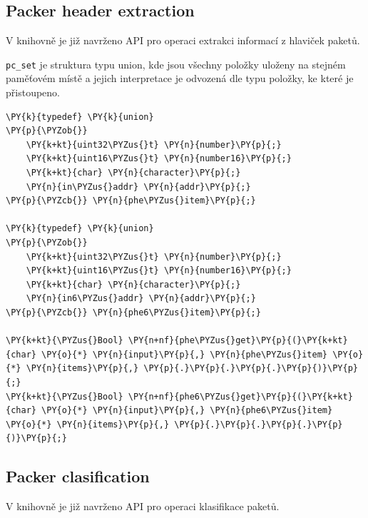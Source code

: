 \subsection{Packer header extraction}
V knihovně je již navrženo API pro operaci extrakci informací z hlaviček paketů.

\texttt{pc\_set} je struktura typu union, kde jsou všechny položky uloženy na stejném paměťovém místě
a jejich interpretace je odvozená dle typu položky, ke které je přistoupeno.

\begin{Verbatim}[commandchars=\\\{\}]
\PY{k}{typedef} \PY{k}{union}
\PY{p}{\PYZob{}}
	\PY{k+kt}{uint32\PYZus{}t} \PY{n}{number}\PY{p}{;}
	\PY{k+kt}{uint16\PYZus{}t} \PY{n}{number16}\PY{p}{;}
	\PY{k+kt}{char} \PY{n}{character}\PY{p}{;}
	\PY{n}{in\PYZus{}addr} \PY{n}{addr}\PY{p}{;}
\PY{p}{\PYZcb{}} \PY{n}{phe\PYZus{}item}\PY{p}{;}

\PY{k}{typedef} \PY{k}{union}
\PY{p}{\PYZob{}}
	\PY{k+kt}{uint32\PYZus{}t} \PY{n}{number}\PY{p}{;}
	\PY{k+kt}{uint16\PYZus{}t} \PY{n}{number16}\PY{p}{;}
	\PY{k+kt}{char} \PY{n}{character}\PY{p}{;}
	\PY{n}{in6\PYZus{}addr} \PY{n}{addr}\PY{p}{;}
\PY{p}{\PYZcb{}} \PY{n}{phe6\PYZus{}item}\PY{p}{;}

\PY{k+kt}{\PYZus{}Bool} \PY{n+nf}{phe\PYZus{}get}\PY{p}{(}\PY{k+kt}{char} \PY{o}{*} \PY{n}{input}\PY{p}{,} \PY{n}{phe\PYZus{}item} \PY{o}{*} \PY{n}{items}\PY{p}{,} \PY{p}{.}\PY{p}{.}\PY{p}{.}\PY{p}{)}\PY{p}{;}
\PY{k+kt}{\PYZus{}Bool} \PY{n+nf}{phe6\PYZus{}get}\PY{p}{(}\PY{k+kt}{char} \PY{o}{*} \PY{n}{input}\PY{p}{,} \PY{n}{phe6\PYZus{}item} \PY{o}{*} \PY{n}{items}\PY{p}{,} \PY{p}{.}\PY{p}{.}\PY{p}{.}\PY{p}{)}\PY{p}{;}
\end{Verbatim}


\subsection{Packer clasification}
V knihovně je již navrženo API pro operaci klasifikace paketů.

